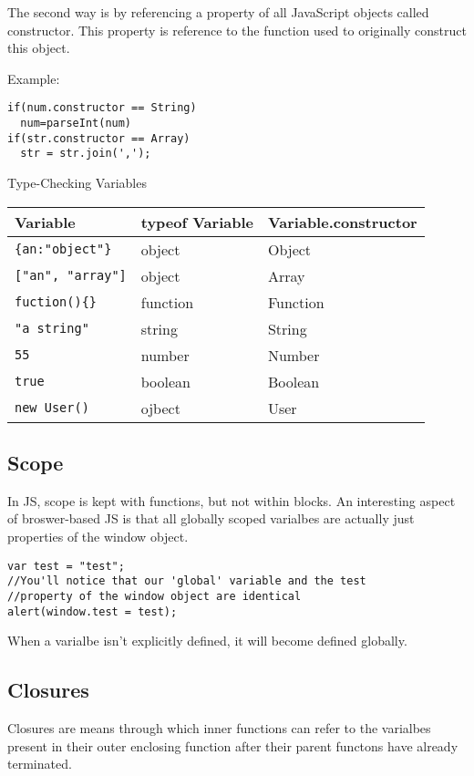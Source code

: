 \documentclass[a4paper,11pt]{book}
\begin{document}
The second way is by referencing a property of all JavaScript objects called
constructor. This property is reference to the function used to originally
construct this object.

Example:
\begin{verbatim}
if(num.constructor == String) 
  num=parseInt(num)
if(str.constructor == Array)
  str = str.join(',');
\end{verbatim}
Type-Checking Variables \\
\begin{tabular}{l l l}
\hline
\textbf{Variable} & \textbf{typeof Variable} & \textbf{Variable.constructor} \\
\hline
\verb|{an:"object"}| & object & Object \\
\verb|["an", "array"]| & object & Array\\
\verb|fuction(){}| & function & Function \\
\verb|"a string"| & string & String \\
\verb|55| & number & Number\\
\verb|true| & boolean & Boolean \\
\verb|new User()| & ojbect & User
\end{tabular}
\subsection{Scope}
In JS, scope is kept with functions, but not within blocks. An interesting
aspect of broswer-based JS is that all globally scoped varialbes are actually
just properties of the window object.
\begin{verbatim}
var test = "test";
//You'll notice that our 'global' variable and the test
//property of the window object are identical
alert(window.test = test);
\end{verbatim}

When a varialbe isn't explicitly defined, it will become defined globally.

\subsection{Closures}
Closures are means through which inner functions can refer to the varialbes
present in their outer enclosing function after their parent functons have
already terminated.
\end{document}
